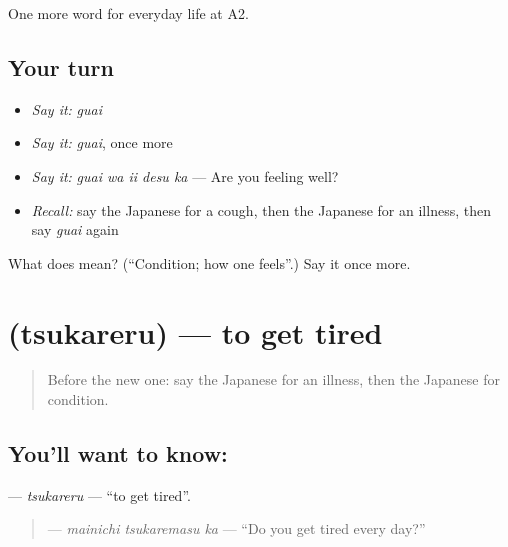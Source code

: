 \begin{grammarlens}[title={What you've built}]
One more word for everyday life at A2.
\end{grammarlens}

\subsection*{Your turn}
\begin{itemize}
\raggedright
  \item \emph{Say it:} \emph{guai}
  \item \emph{Say it:} \emph{guai}, once more
  \item \emph{Say it:} \emph{guai wa ii desu ka} — Are you feeling well?
  \item \emph{Recall:} say the Japanese for a cough, then the Japanese for an illness, then say \emph{guai} again
\end{itemize}

\begin{tcolorbox}[breakable,colback=teal!4,colframe=teal!35!black,title={Before you move on}]
What does  mean? (\textquotedblleft{}Condition; how one feels\textquotedblright{}.) Say it once more.
\end{tcolorbox}
\section[\texorpdfstring{\ja{つかれる} (tsukareru)}{つかれる (tsukareru)}]{ (tsukareru) — to get tired}

\label{lesson:JA-C216-tsukareru}



\begin{quote}
Before the new one: say the Japanese for an illness, then the Japanese for condition.
\end{quote}

\subsection*{You'll want to know: }
\textbf{} — \emph{tsukareru} — \textquotedblleft{}to get tired\textquotedblright{}.

\begin{quote}
\textbf{ } — \emph{mainichi tsukaremasu ka} — \textquotedblleft{}Do you get tired every day?\textquotedblright{}
\end{quote}

